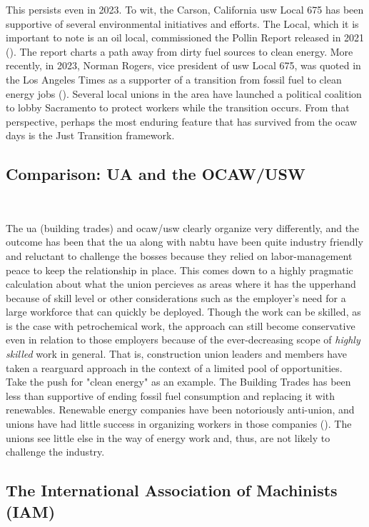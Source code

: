 \documentclass[12pt]{article}
\begin{document}
This persists even in 2023. To wit, the Carson, California \acrshort{usw} Local 675 has been supportive of several environmental initiatives and efforts. The Local, which it is important to note is an oil local, commissioned the Pollin Report released in 2021 (\cite{pollinProgramEconomicRecovery2021}). The report charts a path away from dirty fuel sources to clean energy. More recently, in 2023, Norman Rogers, vice president of \acrshort{usw} Local 675, was quoted in the Los Angeles Times as a supporter of a transition from fossil fuel to clean energy jobs (\cite{rothCanClimateActivists2023}). Several local unions in the area have launched a political coalition to lobby Sacramento to protect workers while the transition occurs. From that perspective, perhaps the most enduring feature that has survived from the \acrshort{ocaw} days is the Just Transition framework.

\subsection{Comparison: UA and the OCAW/USW}\

The \acrfull{ua} (building trades) and \acrshort{ocaw}/\acrshort{usw} clearly organize very differently, and the outcome has been that the \acrshort{ua} along with \acrfull{nabtu} have been quite industry friendly and reluctant to challenge the bosses because they relied on labor-management peace to keep the relationship in place. This comes down to a highly pragmatic calculation about what the union percieves as areas where it has the upperhand because of skill level or other considerations such as the employer's need for a large workforce that can quickly be deployed. Though the work can be skilled, as is the case with petrochemical work, the approach can still become conservative even in relation to those employers because of the ever-decreasing scope of \emph{highly skilled} work in general. That is, construction union leaders and members have taken a rearguard approach in the context of a limited pool of opportunities. Take the push for "clean energy" as an example. The Building Trades has been less than supportive of ending fossil fuel consumption and replacing it with renewables. Renewable energy companies have been notoriously anti-union, and unions have had little success in organizing workers in those companies (\cite{scheiberBuildingSolarFarms2021}). The unions see little else in the way of energy work and, thus, are not likely to challenge the industry.


\subsection{The International Association of Machinists (IAM)} \
\end{document}

